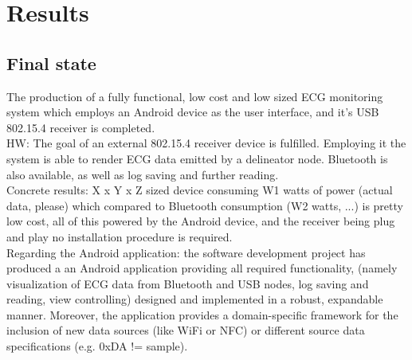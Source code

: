 \chapter{Results}
\label{cha:results}

	\section{Final state}
	

		The production of a fully functional, low cost and low sized ECG monitoring system which employs an Android device as the user interface, and it's USB 802.15.4 receiver is completed.\\

		HW: The goal of an external 802.15.4 receiver device is fulfilled. Employing it the system is able to render ECG data emitted by a delineator node. Bluetooth is also available, as well as log saving and further reading.\\

		Concrete results: X x Y x Z sized device consuming W1 watts of power (actual data, please) which compared to Bluetooth consumption (W2 watts, ...) is pretty low cost, all of this powered by the Android device, and the receiver being plug and play no installation procedure is required.\\

		Regarding the Android application: the software development project has produced a an Android application providing all required functionality, (namely visualization of ECG data from Bluetooth and USB nodes, log saving and reading, view controlling) designed and implemented in a robust, expandable manner. Moreover, the application provides a domain-specific framework for the inclusion of new data sources (like WiFi or NFC) or different source data specifications (e.g. 0xDA != sample).

